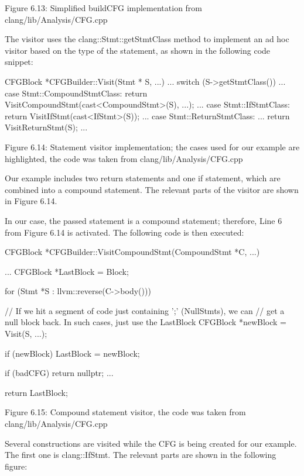 \begin{center}
Figure 6.13: Simplified buildCFG implementation from clang/lib/Analysis/CFG.cpp
\end{center}

The visitor uses the clang::Stmt::getStmtClass method to implement an ad hoc visitor based on the type of the statement, as shown in the following code snippet:

\begin{cpp}
CFGBlock *CFGBuilder::Visit(Stmt * S, ...) {
  ...
  switch (S->getStmtClass()) {
  ...
  case Stmt::CompoundStmtClass:
  return VisitCompoundStmt(cast<CompoundStmt>(S), ...);
  ...
  case Stmt::IfStmtClass:
  return VisitIfStmt(cast<IfStmt>(S));
  ...
  case Stmt::ReturnStmtClass:
  ...
  return VisitReturnStmt(S);
  ...
  }
}
\end{cpp}


\begin{center}
Figure 6.14: Statement visitor implementation; the cases used for our example are highlighted, the code was taken from clang/lib/Analysis/CFG.cpp
\end{center}

Our example includes two return statements and one if statement, which are combined into a compound statement. The relevant parts of the visitor are shown in Figure 6.14.

In our case, the passed statement is a compound statement; therefore, Line 6 from Figure 6.14 is activated. The following code is then executed:

\begin{cpp}
CFGBlock *CFGBuilder::VisitCompoundStmt(CompoundStmt *C, ...) {
  ...
  CFGBlock *LastBlock = Block;

  for (Stmt *S : llvm::reverse(C->body())) {
    // If we hit a segment of code just containing ';' (NullStmts), we can
    // get a null block back.  In such cases, just use the LastBlock
    CFGBlock *newBlock = Visit(S, ...);

    if (newBlock)
      LastBlock = newBlock;

    if (badCFG)
      return nullptr;
    ...
  }

  return LastBlock;
}
\end{cpp}


\begin{center}
Figure 6.15: Compound statement visitor, the code was taken from clang/lib/Analysis/CFG.cpp
\end{center}

Several constructions are visited while the CFG is being created for our example. The first one is clang::IfStmt. The relevant parts are shown in the following figure:

